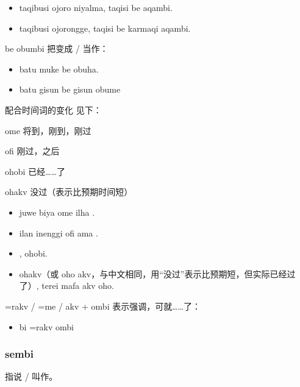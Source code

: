 \begin{des}
        \begin{itemize}
            \item taqibusi ojoro niyalma, taqisi be  aqambi.
            \item taqibusi ojorongge, taqisi be karmaqi aqambi.
        \end{itemize}
    \item[\A \B be \C obumbi] \A 把\B 变成 / 当作\C ：
        \begin{itemize}
            \item batu muke be  obuha.
            \item batu  gisun be  gisun obume 
        \end{itemize}
    \item[配合时间词的变化]见下：
        \begin{des}
            \item[ome] 将到，刚到，刚过
            \item[ofi] 刚过，之后
            \item[ohobi] 已经……了
            \item[ohakv] 没过（表示比预期时间短） 
        \end{des}
        \begin{itemize}
            \item juwe biya ome  ilha .
            \item ilan inenggi ofi ama .
            \item {},  ohobi.
            \item {} ohakv（或 oho akv，与中文相同，用“没过”表示比预期短，但实际已经过了）, terei mafa akv oho.
        \end{itemize}
    \item[\V=rakv / \V=me / akv + ombi] 表示强调，可就……了：
        \begin{itemize}
            \item bi  \!=rakv ombi
        \end{itemize}
\end{des}

\subsubsection{sembi}

指说 / 叫作。

